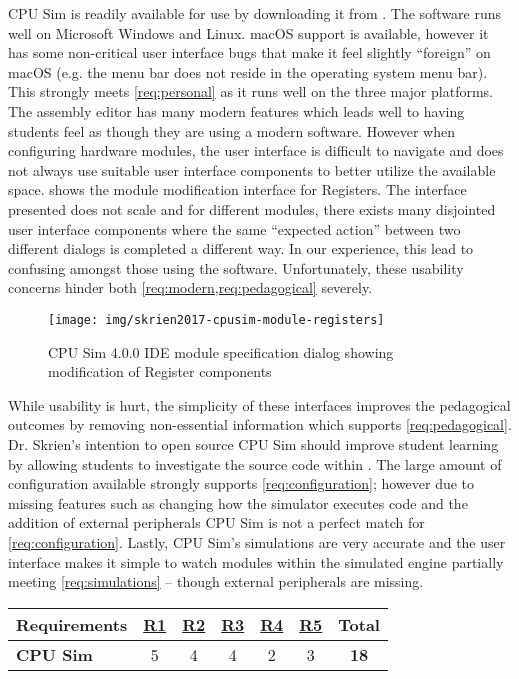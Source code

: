 CPU Sim is readily available for use by downloading it from \cite{Skrien2017}. The software runs well on Microsoft Windows and Linux. macOS support is available, however it has some non-critical user interface bugs that make it feel slightly ``foreign'' on macOS (e.g. the menu bar does not reside in the operating system menu bar). This strongly meets \cref{req:personal} as it runs well on the three major platforms. The assembly editor has many modern features which leads well to having students feel as though they are using a modern software. However when configuring hardware modules, the user interface is difficult to navigate and does not always use suitable user interface components to better utilize the available space.  shows the module modification interface for Registers. The interface presented does not scale and for different modules, there exists many disjointed user interface components where the same ``expected action'' between two different dialogs is completed a different way. In our experience, this lead to confusing amongst those using the software. Unfortunately, these usability concerns hinder both \cref{req:modern,req:pedagogical} severely. 

\begin{figure}[th!]
    \centering
    \texttt{[image: img/skrien2017-cpusim-module-registers]}
    \caption{CPU Sim 4.0.0 IDE module specification dialog showing modification of Register components \cite{Skrien2017}}
    \label{fig:skrien2017-cpusim-module-registers}
\end{figure}

While usability is hurt, the simplicity of these interfaces improves the pedagogical outcomes by removing non-essential information which supports \cref{req:pedagogical}. Dr. Skrien's intention to open source CPU Sim should improve student learning by allowing students to investigate the source code within \cite{Skrien2016,Coppola2004,Koohang2005}. The large amount of configuration available strongly supports \cref{req:configuration}; however due to missing features such as changing how the simulator executes code and the addition of external peripherals CPU Sim is not a perfect match for \cref{req:configuration}. Lastly, CPU Sim's simulations are very accurate and the user interface makes it simple to watch modules within the simulated engine partially meeting \cref{req:simulations} -- though external peripherals are missing.

\begin{table}[h!]
    \centering
    \begin{tabular}{lcccccc}
        \textbf{Requirements} & \textbf{\hyperref[req:personal]{R1}} & \textbf{\hyperref[req:configuration]{R2}} & \textbf{\hyperref[req:pedagogical]{R3}} & \textbf{\hyperref[req:simulations]{R4}} & \textbf{\hyperref[req:modern]{R5}} & \textbf{Total} \\ \hline
        \textbf{CPU Sim \cite{Skrien2001, Skrien2001}}
        & 5 & 4 & 4 & 2 & 3 & \textbf{18} \\
    \end{tabular}
\end{table}

